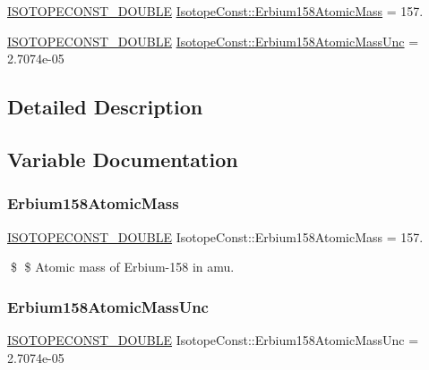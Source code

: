 \begin{DoxyCompactItemize}
\item 
\mbox{\hyperlink{group___isotope_const-_macros_ga8f45a7272ce02c0b4c65c44636ed719a}{I\+S\+O\+T\+O\+P\+E\+C\+O\+N\+S\+T\+\_\+\+D\+O\+U\+B\+LE}} \mbox{\hyperlink{group___isotope_const-_erbium-_er158_gada51cb5bf7df52b488d3caec6453fa9d}{Isotope\+Const\+::\+Erbium158\+Atomic\+Mass}} = 157.
\item 
\mbox{\hyperlink{group___isotope_const-_macros_ga8f45a7272ce02c0b4c65c44636ed719a}{I\+S\+O\+T\+O\+P\+E\+C\+O\+N\+S\+T\+\_\+\+D\+O\+U\+B\+LE}} \mbox{\hyperlink{group___isotope_const-_erbium-_er158_gab4183a30a4a8d9ce60a2770fccc4c8bf}{Isotope\+Const\+::\+Erbium158\+Atomic\+Mass\+Unc}} = 2.\+7074e-\/05
\end{DoxyCompactItemize}


\subsection{Detailed Description}


\subsection{Variable Documentation}
\mbox{\label{group___isotope_const-_erbium-_er158_gada51cb5bf7df52b488d3caec6453fa9d}} 
\subsubsection{\texorpdfstring{Erbium158\+Atomic\+Mass}{Erbium158AtomicMass}}
{\footnotesize\ttfamily \mbox{\hyperlink{group___isotope_const-_macros_ga8f45a7272ce02c0b4c65c44636ed719a}{I\+S\+O\+T\+O\+P\+E\+C\+O\+N\+S\+T\+\_\+\+D\+O\+U\+B\+LE}} Isotope\+Const\+::\+Erbium158\+Atomic\+Mass = 157.}

\$ \$ Atomic mass of Erbium-\/158 in amu. \mbox{\label{group___isotope_const-_erbium-_er158_gab4183a30a4a8d9ce60a2770fccc4c8bf}} 
\subsubsection{\texorpdfstring{Erbium158\+Atomic\+Mass\+Unc}{Erbium158AtomicMassUnc}}
{\footnotesize\ttfamily \mbox{\hyperlink{group___isotope_const-_macros_ga8f45a7272ce02c0b4c65c44636ed719a}{I\+S\+O\+T\+O\+P\+E\+C\+O\+N\+S\+T\+\_\+\+D\+O\+U\+B\+LE}} Isotope\+Const\+::\+Erbium158\+Atomic\+Mass\+Unc = 2.\+7074e-\/05}

